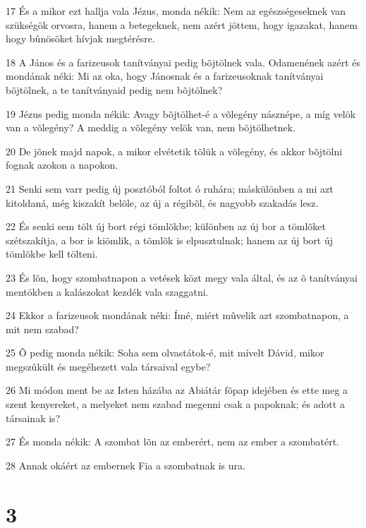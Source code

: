 \par 17 És a mikor ezt hallja vala Jézus, monda nékik: Nem az egészségeseknek van szükségök orvosra, hanem a betegeknek, nem azért jöttem, hogy igazakat, hanem hogy bûnösöket hívjak megtérésre.
\par 18 A János és a farizeusok tanítványai pedig bõjtölnek vala. Odamenének azért és mondának néki: Mi az oka, hogy Jánosnak és a farizeusoknak tanítványai bõjtölnek, a te tanítványaid pedig nem bõjtölnek?
\par 19 Jézus pedig monda nékik: Avagy bõjtölhet-é a võlegény násznépe, a míg velök van a võlegény? A meddig a võlegény velök van, nem bõjtölhetnek.
\par 20 De jõnek majd napok, a mikor elvétetik tõlük a võlegény, és akkor bõjtölni fognak azokon a napokon.
\par 21 Senki sem varr pedig új posztóból foltot ó ruhára; máskülönben a mi azt kitoldaná, még kiszakít belõle, az új a régibõl, és nagyobb szakadás lesz.
\par 22 És senki sem tölt új bort régi tömlõkbe; különben az új bor a tömlõket szétszakítja, a bor is kiömlik, a tömlõk is elpusztulnak; hanem az új bort új tömlõkbe kell tölteni.
\par 23 És lõn, hogy szombatnapon a vetések közt megy vala által, és az õ tanítványai mentökben a kalászokat kezdék vala szaggatni.
\par 24 Ekkor a farizeusok mondának néki: Ímé, miért mûvelik azt szombatnapon, a mit nem szabad?
\par 25 Õ pedig monda nékik: Soha sem olvastátok-é, mit mívelt Dávid, mikor megszûkült és megéhezett vala társaival egybe?
\par 26 Mi módon ment be az Isten házába az Abiátár fõpap idejében és ette meg a szent kenyereket, a melyeket nem  szabad megenni csak a papoknak; és adott a társainak is?
\par 27 És monda nékik: A szombat lõn az emberért, nem az ember a szombatért.
\par 28 Annak okáért az embernek Fia a szombatnak is ura.

\chapter{3}

